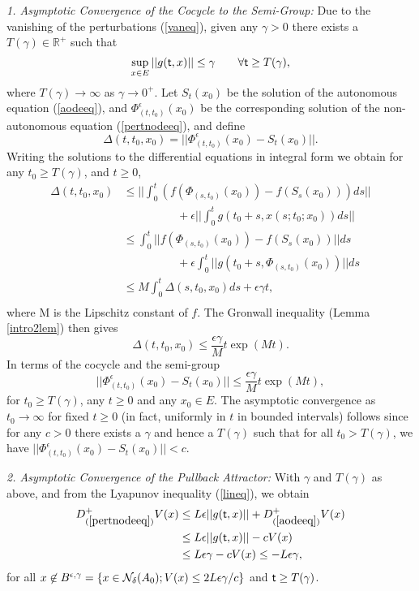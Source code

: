 \begin{prf}
{\em 1. Asymptotic Convergence of the Cocycle to the Semi-Group:}
  Due to the vanishing of the perturbations (\ref{vaneq}), given any
  $\gamma > 0$ there exists a $T(\gamma) \in \mathbb{R}^+$ such that
  \[ \sup_{x \in E} ||g( \mathsf{\mathsf{t}},x)|| \leq \gamma  \qquad \forall  \mathsf{\mathsf{t}} \geq
                        T(\gamma), \]
  where $T(\gamma) \rightarrow \infty$ as $\gamma \rightarrow 0^+$.
  Let $S_t(x_0)$ be the solution of the autonomous equation (\ref{aodeeq}),
  and $\Phi^{\epsilon}_{(t,t_0)}(x_0)$ be the corresponding solution of the
  non-autonomous equation (\ref{pertnodeeq}), and define
  \[ \Delta(t,t_0,x_0) = ||\Phi^{\epsilon}_{(t,t_0)}(x_0) - S_t(x_0)||. \]
  Writing the solutions to the differential equations in integral form 
  we obtain for any $t_0 \geq T(\gamma)$, and $t \geq 0$,
  \begin{align*}
    \Delta(t,t_0,x_0) & \leq || \int^t_0 \left(
                f(\Phi_{(s,t_0)}(x_0)) - f(S_s(x_0)) \right) ds || \\
    & \hspace{2cm} + \epsilon || \int^t_0 g(t_0 + s, x(s;t_0;x_0)) ds || \\
    & \leq \int^t_0 || f(\Phi_{(s,t_0)}(x_0)) - f(S_s(x_0)) || ds  \\
    & \hspace{2cm} + \epsilon \int^t_0 || g(t_0 + s, \Phi_{(s,t_0)}(x_0)) || ds \\
    & \leq M \int^t_0 \Delta(s,t_0,x_0) ds + \epsilon \gamma t, \\
  \end{align*}
  where M is the Lipschitz constant of $f$. The Gronwall inequality
  (Lemma \ref{intro2lem}) then gives
  \[ \Delta(t,t_0,x_0) \leq \frac{\epsilon \gamma}{M} t \exp (Mt). \]
  In terms of the cocycle and the semi-group
  \[ ||\Phi^{\epsilon}_{(t,t_0)}(x_0) - S_t(x_0)|| \leq \frac{\epsilon
        \gamma}{M} t \exp (Mt), \]
  for $t_0 \geq T(\gamma)$, any $t \geq 0$ and any $x_0 \in E$. The
  asymptotic convergence as $t_0 \rightarrow \infty$ for fixed $t \geq 0$
  (in fact, uniformly in $t$ in bounded intervals) follows since for any
  $c > 0$ there exists a $\gamma$ and hence a $T(\gamma)$ such that for all
  $t_0 > T(\gamma)$, we have $||\Phi^{\epsilon}_{(t,t_0)}(x_0) - S_t(x_0)||
  < c$.

{\em 2. Asymptotic Convergence of the Pullback Attractor:}
With $\gamma$ and $T(\gamma)$ as above, and from the Lyapunov inequality
(\ref{lineq}), we obtain
\begin{align*}
  D^{+}_{(\ref{pertnodeeq})}V(x) &\leq L \epsilon ||g( \mathsf{\mathsf{t}},x)|| +
        D^{+}_{(\ref{aodeeq})}V(x) \\
  & \leq L \epsilon ||g( \mathsf{\mathsf{t}},x)|| - c V(x) \\
  & \leq L \epsilon \gamma - c V(x) \leq - L \epsilon \gamma, \\
\end{align*}
for all $x \not \in B^{\epsilon, \gamma} = \{ x \in \mathcal{N}_{\delta}(A_0) ;
V(x) \leq 2L \epsilon \gamma / c \}$ and $ \mathsf{\mathsf{t}} \geq T(\gamma)$.


\end{prf}
